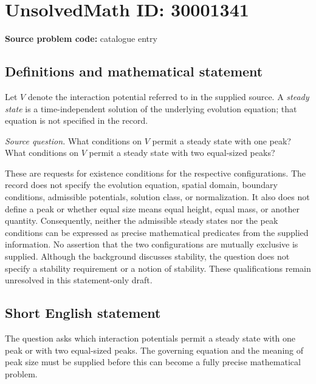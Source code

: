 \documentclass[11pt]{article}
\begin{document}
\section*{UnsolvedMath ID: 30001341}
\textbf{Source problem code:} catalogue entry
\subsection{Definitions and mathematical statement}
Let \(V\) denote the interaction potential referred to in the supplied source. A \emph{steady state} is a time-independent solution of the underlying evolution equation; that equation is not specified in the record.

\emph{Source question.} What conditions on \(V\) permit a steady state with one peak? What conditions on \(V\) permit a steady state with two equal-sized peaks?

These are requests for existence conditions for the respective configurations. The record does not specify the evolution equation, spatial domain, boundary conditions, admissible potentials, solution class, or normalization. It also does not define a peak or whether equal size means equal height, equal mass, or another quantity. Consequently, neither the admissible steady states nor the peak conditions can be expressed as precise mathematical predicates from the supplied information. No assertion that the two configurations are mutually exclusive is supplied. Although the background discusses stability, the question does not specify a stability requirement or a notion of stability. These qualifications remain unresolved in this statement-only draft.
\subsection{Short English statement}
The question asks which interaction potentials permit a steady state with one peak or with two equal-sized peaks. The governing equation and the meaning of peak size must be supplied before this can become a fully precise mathematical problem.
\end{document}
